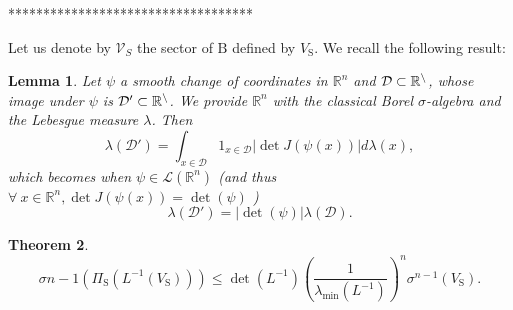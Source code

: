 \documentclass[letterpaper, 10 pt, conference]{ieeeconf}  %
\newcommand{\R}{\mathbb{R} }
\newcommand{\proj}{\Pi }
\newcommand{\calD}{\mathcal{D}}
\newcommand{\sphere}{\text{S}}
\newcommand{\ball}{\text{B}}
\newcommand{\calV}{\mathcal{V}}
\newtheorem{theorem}{Theorem}[section]
\newtheorem{lemma}[theorem]{Lemma}
\begin{document}
***********************************

Let us denote by $\calV_S$ the sector of $\ball$ defined by $V_{\sphere}$. We recall the following result:

\begin{lemma} 
Let $\psi$ a smooth change of coordinates in $\mathbb{R}^n$ and $\cal{D} \subset \R^n$, whose image under $\psi$ is $\cal{D}' \subset \R^n$. We provide $\R^n$ with the classical Borel $\sigma$-algebra and the Lebesgue measure $\lambda$. Then
\begin{equation}
\lambda(\calD') = \int_{x \in \calD} 1_{x \in \calD} |\det J(\psi(x))| d\lambda(x),
\end{equation}
which becomes when $\psi \in \mathcal{L}(\R^n)$ (and thus $\forall\ x \in \R^n, \det J(\psi(x)) = \det(\psi)$ )
\begin{equation}
\lambda(\calD') = |\det(\psi)| \lambda(\calD).
\end{equation}
\end{lemma}


\begin{theorem} \label{lemma:lip}
\begin{equation}
\sigma{n-1}(\proj_\sphere(L^{-1}(V_\sphere))) \leq \det(L^{-1}) \left(\frac{1}{\lambda_{\min}(L^{-1})}\right)^n \sigma^{n-1}(V_\sphere).
\end{equation}   
\end{theorem}
\end{document}
